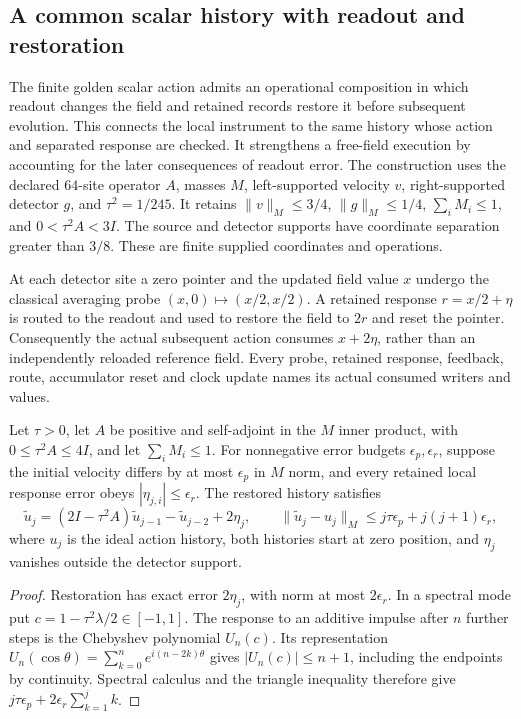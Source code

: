 \subsection{A common scalar history with readout and restoration}
\label{sec:common-history-feedback}

The finite golden scalar action admits an operational composition in which
readout changes the field and retained records restore it before subsequent
evolution. This connects the local instrument to the same history whose
action and separated response are checked. It strengthens a free-field
execution by accounting for the later consequences of readout error.
The construction uses the declared $64$-site operator $A$, masses $M$,
left-supported velocity $v$, right-supported detector $g$, and
$\tau^2=1/245$. It retains $\|v\|_M\le3/4$, $\|g\|_M\le1/4$,
$\sum_iM_i\le1$, and $0<\tau^2 A<3I$.
The source and detector supports have coordinate separation greater than
$3/8$. These are finite supplied coordinates and operations.

At each detector site a zero pointer and the updated field value
$x$ undergo the classical averaging probe
$(x,0)\mapsto(x/2,x/2)$. A retained response
$r=x/2+\eta$ is routed to the readout and used to restore the field to
$2r$ and reset the pointer. Consequently the actual subsequent action
consumes $x+2\eta$, rather than an independently reloaded reference field.
Every probe, retained response, feedback, route, accumulator reset and
clock update names its actual consumed writers and values.

\begin{proposition}
\label{prop:common-history-feedback-error}
Let $\tau>0$, let $A$ be positive and self-adjoint in the $M$ inner product,
with $0\le\tau^2 A\le4I$, and let $\sum_iM_i\le1$.
For nonnegative error budgets $\epsilon_p,\epsilon_r$, suppose
the initial velocity differs by at most $\epsilon_p$ in $M$ norm,
and every retained local response error obeys
$|\eta_{j,i}|\le\epsilon_r$. The restored history satisfies
\[
 \widetilde u_j=(2I-\tau^2A)\widetilde u_{j-1}
                 -\widetilde u_{j-2}+2\eta_j,
 \qquad
 \|\widetilde u_j-u_j\|_M
 \le j\tau\epsilon_p+j(j+1)\epsilon_r,
\]
where $u_j$ is the ideal action history, both histories start at zero
position, and $\eta_j$ vanishes outside the detector support.
\end{proposition}
\begin{proof}
Restoration has exact error $2\eta_j$, with norm at most
$2\epsilon_r$. In a spectral mode put
$c=1-\tau^2\lambda/2\in[-1,1]$. The response to an additive impulse
after $n$ further steps is the Chebyshev polynomial $U_n(c)$.
Its representation $U_n(\cos\theta)=\sum_{k=0}^n
e^{i(n-2k)\theta}$ gives $|U_n(c)|\le n+1$, including the
endpoints by continuity. Spectral calculus and the triangle inequality
therefore give $j\tau\epsilon_p+
2\epsilon_r\sum_{k=1}^j k$.
\end{proof}

